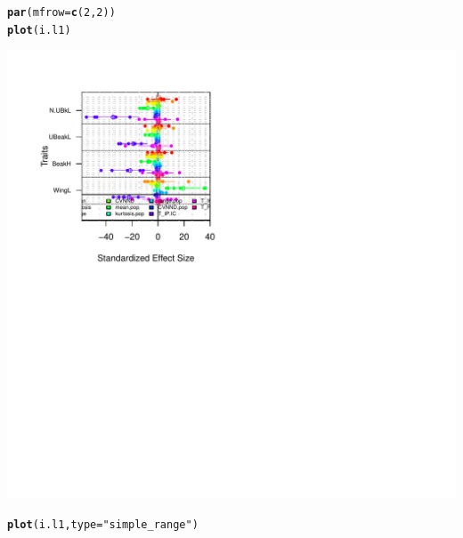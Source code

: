 \documentclass[12pt]{article}\usepackage[]{graphicx}\usepackage[]{color}
\makeatletter
\def\maxwidth{ %
  \ifdim\Gin@nat@width>\linewidth
    \linewidth
  \else
    \Gin@nat@width
  \fi
}
\newcommand{\hlnum}[1]{\textcolor[rgb]{0.686,0.059,0.569}{#1}}%
\newcommand{\hlstr}[1]{\textcolor[rgb]{0.192,0.494,0.8}{#1}}%
\newcommand{\hlstd}[1]{\textcolor[rgb]{0.345,0.345,0.345}{#1}}%
\newcommand{\hlkwc}[1]{\textcolor[rgb]{0.333,0.667,0.333}{#1}}%
\newcommand{\hlkwd}[1]{\textcolor[rgb]{0.737,0.353,0.396}{\textbf{#1}}}%
\newenvironment{kframe}{%
 \def\at@end@of@kframe{}%
 \ifinner\ifhmode%
  \def\at@end@of@kframe{\end{minipage}}%
  \begin{minipage}{\columnwidth}%
 \fi\fi%
 \def\FrameCommand##1{\hskip\@totalleftmargin \hskip-\fboxsep
 \colorbox{shadecolor}{##1}\hskip-\fboxsep
     \hskip-\linewidth \hskip-\@totalleftmargin \hskip\columnwidth}%
 \MakeFramed {\advance\hsize-\width
   \@totalleftmargin\z@ \linewidth\hsize
   \@setminipage}}%
 {\par\unskip\endMakeFramed%
 \at@end@of@kframe}
\newenvironment{knitrout}{}{} %
\makeatother
\begin{document}
\begin{knitrout}
\color{fgcolor}\begin{kframe}
\begin{alltt}
\hlkwd{par}\hlstd{(}\hlkwc{mfrow}\hlstd{=}\hlkwd{c}\hlstd{(}\hlnum{2}\hlstd{,}\hlnum{2}\hlstd{))}
\hlkwd{plot}\hlstd{(i.l1)}
\end{alltt}
\end{kframe}
\includegraphics[width=\maxwidth]{figure/unnamed-chunk-431} 
\begin{kframe}\begin{alltt}
\hlkwd{plot}\hlstd{(i.l1,}\hlkwc{type}\hlstd{=}\hlstr{"simple_range"}\hlstd{)}
\end{alltt}



\end{kframe}
\end{knitrout}
\end{document}
